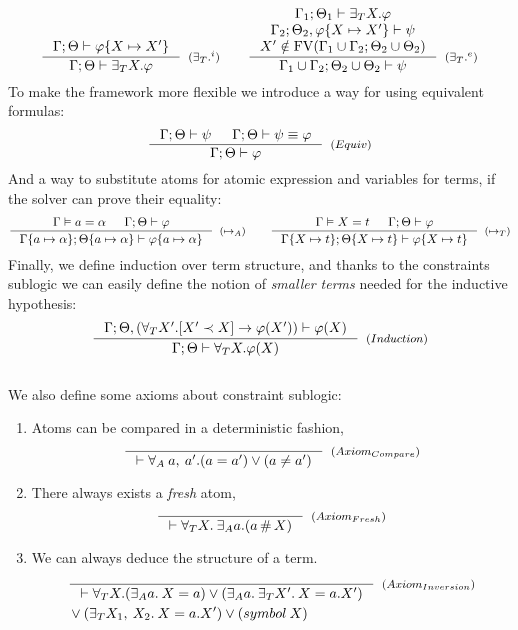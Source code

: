 \documentclass[english, mgr]{iithesis}
\begin{document}
$$
  \inference{
    \jgmnt[\cEnv;\Theta]{\formphi \{\termv \mapsto \termv'\}}
    }{
    \jgmnt[\cEnv;\Theta]{\fExistsTerm{\termv}\formphi}
  }[(\ensuremath{{\fExistsTerm{}}^i})]
  \qquad
  \inference{
    \jgmnt[\cEnv_1;\Theta_1]{\fExistsTerm{\termv}\formphi} \\
    \jgmnt[\cEnv_2;\Theta_2,\formphi \{\termv \mapsto \termv'\}]{\psi} \\
    \termv' \notin \fv[\cEnv_1 \cup \cEnv_2;\Theta_2 \cup \Theta_2]
    }{
    \jgmnt[\cEnv_1 \cup \cEnv_2;\Theta_2 \cup \Theta_2]{\psi}
  }[(\ensuremath{{\fExistsTerm{}}^e})]
$$
To make the framework more flexible we introduce a way for using equivalent formulas:
$$
  \inference{
    \jgmnt[\cEnv;\Theta]{\psi} &
    \jgmnt[\cEnv;\Theta]{\psi \equiv \formphi}
    }{
    \jgmnt[\cEnv;\Theta]{\formphi}
  }[(\ensuremath{Equiv})]
$$
And a way to substitute atoms for atomic expression and variables for terms, if the solver can prove their equality:
$$
  \inference{
    \cjgmnt[\cEnv]{\atomv \ceq \atomexp} &
    \jgmnt[\cEnv;\Theta]{\formphi}
    }{
    \jgmnt[\cEnv\{\atomv \mapsto \atomexp\};\Theta\{\atomv \mapsto \atomexp\}]{\formphi\{\atomv \mapsto \atomexp\}}
  }[(\ensuremath{\mapsto_A})]
\qquad
  \inference{
    \cjgmnt[\cEnv]{\termv \ceq \term} &
    \jgmnt[\cEnv;\Theta]{\formphi}
    }{
    \jgmnt[\cEnv\{\termv \mapsto \term\};\Theta\{\termv \mapsto \term\}]{\formphi\{\termv \mapsto \term\}}
  }[(\ensuremath{\mapsto_T})]
$$
Finally, we define induction over term structure,
and thanks to the constraints sublogic we can easily define the notion of
\textit{smaller terms} needed for the inductive hypothesis:
$$
  \inference{
    \jgmnt[\cEnv;\Theta, (\fForallTerm{\termv'} \fCImp{\termv' \cshlt \termv} \formphi(\termv'))]{\formphi(\termv)}
    }{
    \jgmnt[\cEnv;\Theta]{\fForallTerm{\termv} \formphi(\termv)}
  }[(\ensuremath{Induction})]
$$
\\
We also define some axioms about constraint sublogic:
\begin{enumerate}
\item Atoms can be compared in a deterministic fashion,
$$
  \inference{
    }{
    \jgmnt[]{\fForallAtom{\:\atomv,\:\atomv'} (\atomv \ceq \atomv') \vee (\atomv \cneq \atomv')}
  }[(\ensuremath{Axiom_{Compare}})]
$$
\item There always exists a \textit{fresh} atom,
$$
  \inference{
    }{
    \jgmnt[]{\fForallTerm{\termv} \:\fExistsAtom{\atomv} (\atomv \cfresh \termv)}
  }[(\ensuremath{Axiom_{Fresh}})]
$$
\item We can always deduce the structure of a term.
\begin{eqnarray*}
  & \inference{
    }{
    \jgmnt[]{\fForallTerm{\termv} (\fExistsAtom{\atomv}\: \termv = \atomv) \vee (\fExistsAtom{\atomv}\:\fExistsTerm{\termv'}\: \termv = \tbind{\atomv}{\termv'}) }
  }[(\ensuremath{Axiom_{Inversion}})] \\
  & \ensuremath{\vee (\fExistsTerm{\termv_1,\:\termv_2}\: \termv = \tbind{\atomv}{\termv'}) \vee ({symbol}\: \termv) } \\
\end{eqnarray*}
\end{enumerate}
\end{document}

